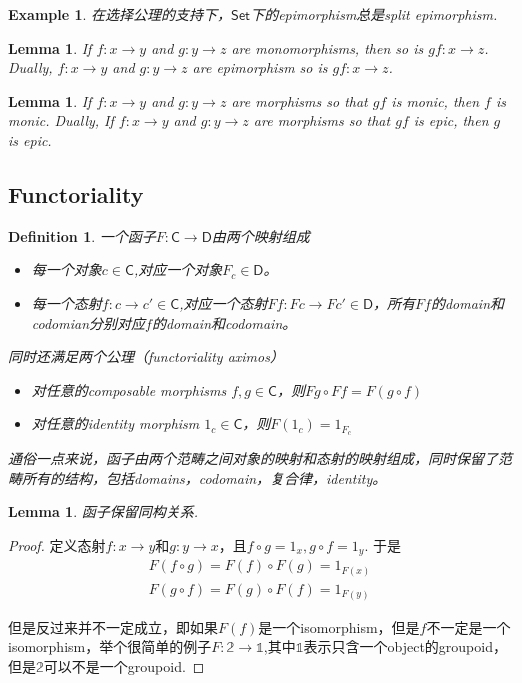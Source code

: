 \documentclass{article}
\newtheorem{lemma}[theorem]{Lemma}
\newtheorem{example}[theorem]{Example}
\newtheorem{definition}[theorem]{Definition}
\newcommand*{\cat}[1]{\textsf{#1}\xspace}
\newcommand*{\xfunc}[4]{{#2}\colon{#3}{#1}{#4}}
\newcommand*{\func}[3]{\xfunc{\to}{#1}{#2}{#3}}
\begin{document}
\begin{example}
\rm 在选择公理的支持下，$\cat{Set}$下的epimorphism总是split epimorphism. 
\end{example}

\begin{lemma}
\rm If $\func{f}{x}{y}$ and $\func{g}{y}{z}$ are monomorphisms, then so is $\func{gf}{x}{z}$. Dually, $\func{f}{x}{y}$ and $\func{g}{y}{z}$ are epimorphism so is $\func{gf}{x}{z}$.
\end{lemma}

\begin{lemma}
\rm If $\func{f}{x}{y}$ and $\func{g}{y}{z}$ are morphisms so that $gf$ is monic, then $f$ is monic. Dually, If $\func{f}{x}{y}$ and $\func{g}{y}{z}$ are morphisms so that $gf$ is epic, then $g$ is epic.
\end{lemma}

\newpage
\subsection{Functoriality}


\begin{definition}
\rm 一个函子$F \colon \cat{C} \rightarrow \cat{D}$由两个映射组成
\begin{itemize}
 \item 每一个对象$c \in \cat{C}$,对应一个对象$F_c \in \cat{D}$。
 \item 每一个态射$f \colon c \rightarrow	c' \in \cat{C}$,对应一个态射$Ff \colon Fc \rightarrow Fc' \in \cat{D}$，所有$Ff$的domain和codomian分别对应$f$的domain和codomain。 
\end{itemize}
同时还满足两个公理（functoriality aximos）
\begin{itemize}
 	\item 对任意的composable morphisms $f,g \in \cat{C}$，则$Fg \circ Ff = F(g \circ f)$
 	\item 对任意的identity morphism $1_c \in \cat{C}$，则$F(1_c)=1_{F_c}$
\end{itemize}
通俗一点来说，函子由两个范畴之间对象的映射和态射的映射组成，同时保留了范畴所有的结构，包括domains，codomain，复合律，identity。
\end{definition}


\begin{lemma}
\rm 函子保留同构关系.
\end{lemma}

\begin{proof}
定义态射$\func{f}{x}{y}$和$\func{g}{y}{x}$，且$f \circ g = 1_x,g \circ f=1_y$. 于是
$$
\begin{aligned}
F(f \circ g)=F(f) \circ F(g)= 1_{F(x)} \\
F(g \circ f)=F(g) \circ F(f)= 1_{F(y)}
\end{aligned}
$$

但是反过来并不一定成立，即如果$F(f)$是一个isomorphism，但是$f$不一定是一个isomorphism，举个很简单的例子$\func{F}{\mathbb{2}}{\mathbb{1}}$,其中$\mathbb{1}$表示只含一个object的groupoid，但是$\mathbb{2}$可以不是一个groupoid.
\end{proof}
\end{document}
